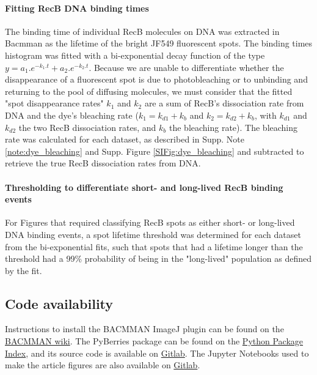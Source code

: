 \paragraph*{Fitting RecB DNA binding times}
The binding time of individual RecB molecules on DNA was extracted in Bacmman as the lifetime of the bright JF549 fluorescent spots. The binding times histogram was fitted with a bi-exponential decay function of the type $y=a_1.e^{-k_1.t} + a_2.e^{-k_2.t}$. Because we are unable to differentiate whether the disappearance of a fluorescent spot is due to photobleaching or to unbinding and returning to the pool of diffusing molecules, we must consider that the fitted "spot disappearance rates" $k_1$ and $k_2$ are a sum of RecB's dissociation rate from DNA and the dye's bleaching rate ($k_1=k_{d1}+k_b$ and $k_2=k_{d2}+k_b$, with $k_{d1}$ and $k_{d2}$ the two RecB dissociation rates, and $k_b$ the bleaching rate). The bleaching rate was calculated for each dataset, as described in Supp. Note \ref{note:dye_bleaching} and Supp. Figure \ref{SIFig:dye_bleaching} and subtracted to retrieve the true RecB dissociation rates from DNA.

\paragraph*{Thresholding to differentiate short- and long-lived RecB binding events}
For Figures that required classifying RecB spots as either short- or long-lived DNA binding events, a spot lifetime threshold was determined for each dataset from the bi-exponential fits, such that spots that had a lifetime longer than the threshold had a 99\% probability of being in the "long-lived" population as defined by the fit.

\subsection*{Code availability}
Instructions to install the BACMMAN ImageJ plugin can be found on the \href{https://github.com/jeanollion/bacmman/wiki/Installation}{BACMMAN wiki}. The PyBerries package can be found on the \href{https://pypi.org/project/PyBerries/}{Python Package Index}, and its source code is available on \href{https://gitlab.com/MEKlab/pyberries}{Gitlab}. The Jupyter Notebooks used to make the article figures are also available on \href{https://gitlab.com/MEKlab/recb_article_figures}{Gitlab}.



